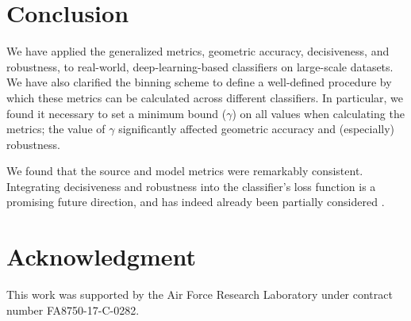 \documentclass{spie}
\begin{document}
\section{Conclusion}
\label{conclude}
We have applied the generalized metrics, geometric accuracy, decisiveness, and robustness, to real-world, deep-learning-based classifiers on large-scale datasets. We have also clarified the binning scheme to define a well-defined procedure by which these metrics can be calculated across different classifiers. In particular, we found it necessary to set a minimum bound ($\gamma$) on all values when calculating the metrics; the value of $\gamma$ significantly affected geometric accuracy and (especially) robustness. 

We found that the source and model metrics were remarkably consistent. Integrating decisiveness and robustness into the classifier's loss function is a promising future direction, and has indeed already been partially considered \cite{nelson3}. 

\section*{Acknowledgment}
This work was supported by the Air Force Research Laboratory under contract number FA8750-17-C-0282. 



\end{document}
